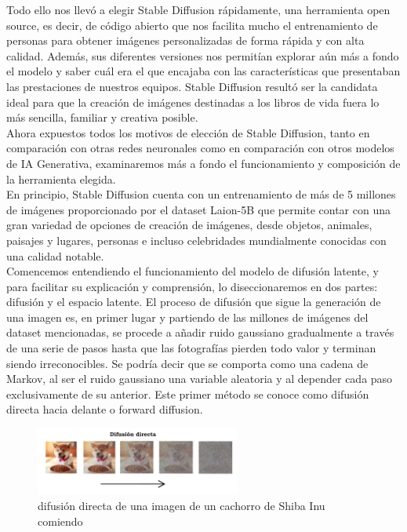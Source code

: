 Todo ello nos llevó a elegir Stable Diffusion rápidamente, una herramienta open source, es decir, de código abierto que nos facilita mucho el entrenamiento de personas para obtener imágenes personalizadas de forma rápida y con alta calidad. Además, sus diferentes versiones nos permitían explorar aún más a fondo el modelo y saber cuál era el que encajaba con las características que presentaban las prestaciones de nuestros equipos. Stable Diffusion resultó ser la candidata ideal para que la creación de imágenes destinadas a  los libros de vida fuera lo más sencilla, familiar y creativa posible. \\

Ahora expuestos todos los motivos de elección de Stable Diffusion, tanto en comparación con otras redes neuronales como en comparación con otros modelos de IA Generativa, examinaremos más a fondo el funcionamiento y composición de la herramienta elegida. \\

En principio, Stable Diffusion cuenta con un entrenamiento de más de 5 millones de imágenes proporcionado por el dataset Laion-5B que permite contar con una gran variedad de opciones de creación de imágenes, desde objetos, animales, paisajes y lugares, personas e incluso celebridades mundialmente conocidas con una calidad notable.\\ 

Comencemos entendiendo el funcionamiento del modelo de difusión latente, y para facilitar su explicación y comprensión,  lo diseccionaremos en dos partes: difusión y el espacio latente. El proceso de difusión que sigue la generación de una imagen es, en primer lugar y partiendo de las millones de imágenes del dataset mencionadas, se procede a añadir ruido gaussiano gradualmente a través de una serie de pasos hasta que las fotografías pierden todo valor y terminan siendo irreconocibles. Se podría decir que se comporta como una cadena de Markov, al ser el ruido gaussiano una variable aleatoria y al depender cada paso exclusivamente de su anterior. Este primer método se conoce como difusión directa hacia delante o forward diffusion.\\

\begin{figure}[h]
	\centering
	\includegraphics[width = 0.6\textwidth]{Imagenes/Vectorial/difusiondirecta.png}
	\caption{difusión directa de una imagen de un cachorro de Shiba Inu comiendo}
	\label{fig:sampleImage}
\end{figure}

